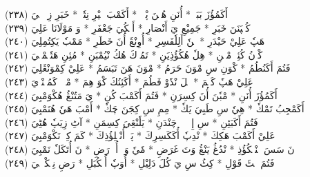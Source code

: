 \documentclass[a4paper, 10pt]{report}
\begin{document}
\begin{center}
\textarabic{(٢٣٨) \textcolor{mygreen}{أَكَمُؤُزَ بَبَكٖ  * أُنَنِ هُنٖنَ پْوٖكٖ  * أَكَمْبَ خٖيْرِ نِتٗكٖ  * خَبَرِ زِمٖئٖنٖيَ }} 
\\[5mm] 

\textarabic{(٢٣٩) \textcolor{mygreen}{كُمٖپَنَنَ خَبَرِ  * جَمِيْعِ يَ أَنْصَارِ  * أَمٖكُيَ جَعْفَرِ  * وَ مَوْلَانَا عَلِيَ }} 
\\[5mm] 

\textarabic{(٢٤٠) \textcolor{mygreen}{هَپٗ عَلِيْ حَيْدَرِ  * نٖنٗ أَلِلٗفَسِرِ  * أُوِنْڠَ أُنَ خَطَرِ  * مَمْبٗ يَكِتُمِلِيَ }} 
\\[5mm] 

\textarabic{(٢٤١) \textcolor{mygreen}{كْوٖنُ كُئِيٖ مْڠٖنِ  * هِلٗ هُكُؤُذِيَنِ  * تَمُوٖكَ هُكُ نْيُمْبَنِ  * مُئِنِ هَتٗتٖمْبٖيَ }} 
\\[5mm] 

\textarabic{(٢٤٢) \textcolor{mygreen}{فَتُمَ أَكَنُطُمُ  * كْوَنِ سِ مْوَنَ حَرَمُ  * مْوَنَ هَنَ تَبَسَمُ  * عَلِيْ كِمْوَنْڠَلِيَ }} 
\\[5mm] 

\textarabic{(٢٤٣) \textcolor{mygreen}{عَلِيْ هَپٗ كَسٖمَ  * هٖلَ نْدٗوْ فَطُمَ  * أَكَئِنُكَ كْوَ هِمَ  * مْكٖوٖ كَمُئٖنْدٖيَ }} 
\\[5mm] 

\textarabic{(٢٤٤) \textcolor{mygreen}{أَكَمُؤُزَ أُنَنِ  * مْبٗنَ أُنَ كِسِرَنِ  * فَتُمَ أَكَمْبَ كُنِ  * يَ مَتُنْڠُ هُكْوَمْبِيَ }} 
\\[5mm] 

\textarabic{(٢٤٥) \textcolor{mygreen}{أَكَمْجِبُ تَمْكٗ  * هِيٗ سِ طَبِيَ يَكٗ  * مِمِ سِ كِجَنَ چَكٗ  * أَمْبَ هَيٗ هُنَمْبِيَ }} 
\\[5mm] 

\textarabic{(٢٤٦) \textcolor{mygreen}{فَتُمَ أَكَبَئِنِ  * سِ إِلٖ پٖٹٖ چَنْدَنِ  * يَلٗنْڠِيَ كِسِمَنِ  * آٹِ زِيَپٗ هُٹِيَ }} 
\\[5mm] 

\textarabic{(٢٤٧) \textcolor{mygreen}{عَلِيْ أَكَمْبَ هَكِكَ  * نْدِپٗ أُكَكَسِرِكَ  * پَلٖ أُنْڠٖلِؤُذِكَ  * كَمَ كِلٖ نَكْوَمْبِيَ }} 
\\[5mm] 

\textarabic{(٢٤٨) \textcolor{mygreen}{نَ سَسَ نٖنْڠٖكُؤُذِ  * نْدُڠُ يَنْڠُ وَتَ غَرَضِ  * مٗيٗ وَكٖ أُوٖ رَضِ  * نَ أُتَكَلٗ نَمْبِيَ }} 
\\[5mm] 

\textarabic{(٢٤٩) \textcolor{mygreen}{فَتُمَ كٖٹَ قَوْلِ  * كِٹُ سِ يَ كُلَ دَلِيْلِ  * أُوَپٗ أُمٖكُبَلِ  * رَضِ نِمٖكْوٖلٖيَ }} 
\\[5mm] 


\end{center}
\end{document}

